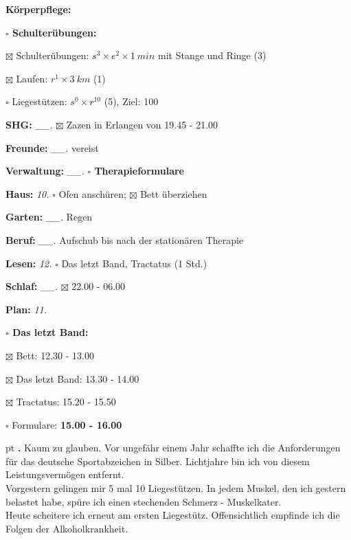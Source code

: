 \documentclass[10pt,a4paper]{article}
\newcounter{notec}
\newcommand\notep[1]{%
  \stepcounter{notec}
  \vskip #1pt
  {\bf\arabic{notec}.}
}
\newcommand\prop[1] {{\color {alizarin} {\bf #1}}}             %
\newcommand\draf[1] {{\color {amber(sae/ece)} {\bf #1}}}       %
\newcommand\mand[1] {{\color {burntorange} {\bf #1}}}          %
\newcommand\topvskip {\vskip 8pt}
\newcommand\topspace{\vskip -15pt \hskip 20pt}
\newcommand\bottomspace{\vskip 4pt}
\newcommand\n[1] { {\sl #1.} \hskip 5pt }
\begin{document}
\begin{mdframed}[style=daystyle]
\begin{labeling}{{\mand {Körperpflege:}}}
\begin{minipage}{0.75\textwidth}
\begin{labeling}{\prop {$\square$ {Schulterübungen:}}}
      \item[$\boxtimes$ Schulterübungen:] $s^3 \times e^2 \times 1\ min$ mit Stange und Ringe (3)
      \item[$\boxtimes$ Laufen:]          $r^1 \times 3\ km$ (1)
      \item[$\square$ Liegestützen:]    $s^0 \times r^{10}$ (5), Ziel: 100
      \end{labeling}
    \end{minipage}
    \bottomspace        
  \item[{\mand {SHG:}}]          \n{\_\_} $\boxtimes$ Zazen in Erlangen von 19.45 - 21.00
  \item[{\mand {Freunde:}}]      \n{\_\_} vereist
  \item[{\mand {Verwaltung:}}]   \n{\_\_} {\prop {$\square$ Therapieformulare}}
  \item[{\mand {Haus:}}]           \n{10} $\square$ Ofen anschüren; $\boxtimes$ Bett überziehen
  \item[{\mand {Garten:}}]       \n{\_\_} Regen
  \item[{\mand {Beruf:}}]        \n{\_\_} Aufschub bis nach der stationären Therapie
  \item[{\mand {Lesen:}}]          \n{12} $\square$ Das letzt Band, Tractatus (1 Std.)
  \item[{\mand {Schlaf:}}]       \n{\_\_} $\boxtimes$ 22.00 - 06.00
  \item[{\mand {Plan:}}]           \n{11}
    \topspace
    \begin{minipage}{0.75\textwidth}  
      \begin{labeling}{\prop {$\square$ {Das letzt Band:}}} 
        \setlength\itemsep{-3pt}
      \item[$\boxtimes$ Bett:]           12.30 - 13.00
      \item[$\boxtimes$ Das letzt Band:] 13.30 - 14.00
      \item[$\boxtimes$ Tractatus:]      15.20 - 15.50
      \item[$\square$   Formulare:]      {\draf {15.00 - 16.00}}
      \end{labeling}
    \end{minipage}
    \bottomspace        
  \end{labeling}

  \topvskip

  \setcounter{notec}{0}

  \notep 0 Kaum zu glauben. Vor ungefähr einem Jahr schaffte ich die Anforderungen für
  das deutsche Sportabzeichen in Silber. Lichtjahre bin ich von diesem
  Leistungsvermögen entfernt. \\
  Vorgestern gelingen mir 5 mal 10 Liegestützen. In jedem Muskel, den ich
  gestern belastet habe, spüre ich einen stechenden Schmerz - Muskelkater. \\
  Heute scheitere ich erneut am ersten Liegestütz. Offensichtlich empfinde ich
  die Folgen der Alkoholkrankheit.


\end{mdframed}
\end{document}
